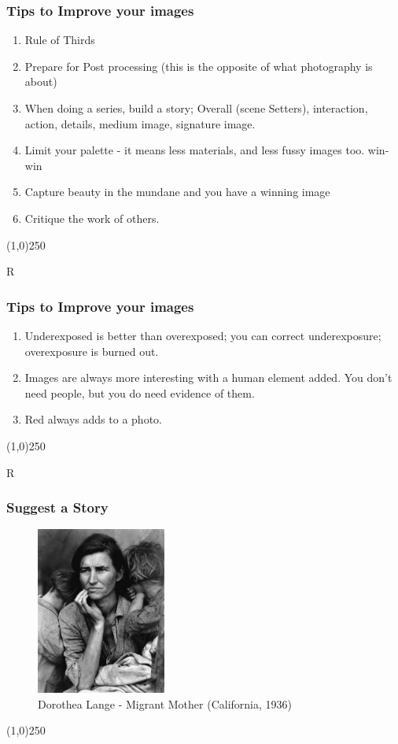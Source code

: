 \begin{frame}
\frametitle{Tips to Improve your images}
\begin{enumerate}
	\item Rule of Thirds
	\item Prepare for Post processing (this is the opposite of what photography is about)
	\item When doing a series, build a story; Overall (scene Setters), interaction, action, details, medium image, signature image.
	\item Limit your palette - it means less materials, and less fussy images too.  win-win
	\item Capture beauty in the mundane and you have a winning image
	\item Critique the work of others.
\end{enumerate}
\end{frame}
\begin{center}\line(1,0){250}\end{center}R




\begin{frame}
\frametitle{Tips to Improve your images}
\begin{enumerate}
	\item Underexposed is better than overexposed; you can correct underexposure; overexposure is burned out.
	\item Images are always more interesting with a human element added.  You don't need people, but you do need evidence of them.
	\item Red always adds to a photo.
\end{enumerate}
\end{frame}
\begin{center}\line(1,0){250}\end{center}R














\begin{frame}
\frametitle{Suggest a Story}
\begin{figure}
	\centering
		\includegraphics[height=5.5cm]{img/candc/DorethaLange.jpg}
	\caption{Dorothea Lange - Migrant Mother (California, 1936)}
	\label{fig:DorotheaLangeMigrantMother}
\end{figure}
\end{frame}
\begin{center}\line(1,0){250}\end{center}


